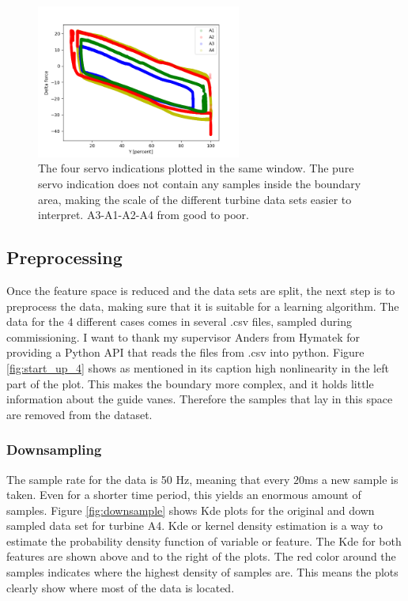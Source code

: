         \begin{figure}[h]
            \centering
            \includegraphics[width = 0.6\textwidth]{figures/data/servo_indication_all_one_plot.png}
            \caption{The four servo indications plotted in the same window. The pure servo indication does not contain any samples inside the boundary area, making the scale of the different turbine data sets easier to interpret. A3-A1-A2-A4 from good to poor.}
            \label{fig:servo_indication_all}
        \end{figure}
        
        
    \subsection{Preprocessing}
        Once the feature space is reduced and the data sets are split, the next step is to preprocess the data, making sure that it is suitable for a learning algorithm. The data for the $4$ different cases comes in several .csv files, sampled during commissioning. I want to thank my supervisor Anders from Hymatek for providing a Python API that reads the files from .csv into python. Figure \ref{fig:start_up_4} shows as mentioned in its caption high nonlinearity in the left part of the plot. This makes the boundary more complex, and it holds little information about the guide vanes. Therefore the samples that lay in this space are removed from the dataset.    
        
        
        \subsubsection{Downsampling}
            The sample rate for the data is 50 Hz, meaning that every $20$ms a new sample is taken. Even for a shorter time period, this yields an enormous amount of samples. Figure \ref{fig:downsample} shows Kde plots for the original and down sampled data set for turbine A4. Kde or kernel density estimation is a way to estimate the probability density function of variable or feature. The Kde for both features are shown above and to the right of the plots. The red color around the samples indicates where the highest density of samples are. This means the plots clearly show where most of the data is located. 
            

